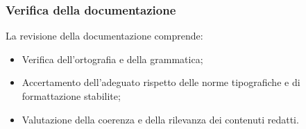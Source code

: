 \subsubsection{Verifica della documentazione}
La revisione della documentazione comprende:
\begin{itemize}
    \item Verifica dell'ortografia e della grammatica;
    \item Accertamento dell'adeguato rispetto delle norme tipografiche e di formattazione stabilite;
    \item Valutazione della coerenza e della rilevanza dei contenuti redatti.
\end{itemize}
